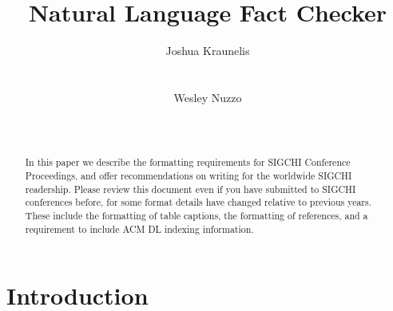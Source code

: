 \documentclass{chi2009}
\begin{document}
\setlength{\paperheight}{11in}
\setlength{\paperwidth}{8.5in}
\setlength{\pdfpageheight}{\paperheight}
\setlength{\pdfpagewidth}{\paperwidth}


\title{Natural Language Fact Checker}
\author{
  \alignauthor Joshua Kraunelis\\
    \\
    \\
  \alignauthor Wesley Nuzzo\\
    \\
    \\
}

\maketitle

\begin{abstract}
  In this paper we describe the formatting requirements for SIGCHI
  Conference Proceedings, and offer recommendations on writing for the
  worldwide SIGCHI readership.  Please review this document even if
  you have submitted to SIGCHI conferences before, for some format
  details have changed relative to previous years. These include the
  formatting of table captions, the formatting of references, and a
  requirement to include ACM DL indexing information.
\end{abstract}


\section{Introduction}
\end{document}
